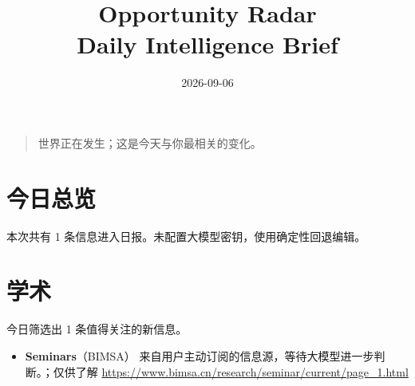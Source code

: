 \documentclass[11pt]{ctexart}
\title{Opportunity Radar\\Daily Intelligence Brief}
\date{2026-09-06}
\begin{document}
\maketitle
\begin{quote}\Large 世界正在发生；这是今天与你最相关的变化。\end{quote}
\section*{今日总览}
本次共有 1 条信息进入日报。未配置大模型密钥，使用确定性回退编辑。
\section*{学术}
今日筛选出 1 条值得关注的新信息。
\begin{itemize}
\item \textbf{Seminars}（BIMSA） 来自用户主动订阅的信息源，等待大模型进一步判断。；仅供了解 \url{https://www.bimsa.cn/research/seminar/current/page_1.html}
\end{itemize}
\end{document}
